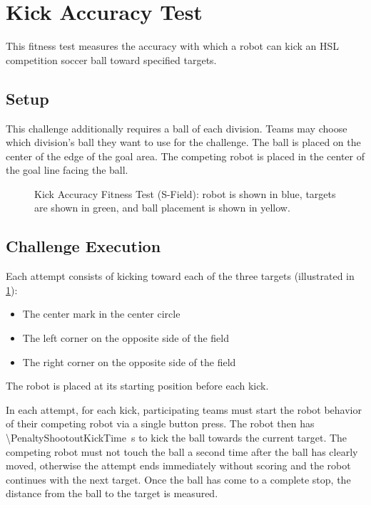 \section{Kick Accuracy Test}
This fitness test measures the accuracy with which a robot can kick an HSL competition soccer ball toward specified targets.

\subsection{Setup}
This challenge additionally requires a ball of each division. Teams may choose which division's ball they want to use for the challenge.
The ball is placed on the center of the edge of the goal area.
The competing robot is placed in the center of the goal line facing the ball.

\begin{figure}[ht]
    \centering
    
    \caption{Kick Accuracy Fitness Test (S-Field): robot is shown in blue, targets are shown in green, and ball placement is shown in yellow.}
    \label{fig:kick_accuracy_test_s}
\end{figure}

\subsection{Challenge Execution}
Each attempt consists of kicking toward each of the three targets (illustrated in \cref{fig:kick_accuracy_test_s}):

\begin{itemize}
    \item The center mark in the center circle
    \item The left corner on the opposite side of the field
    \item The right corner on the opposite side of the field
\end{itemize}

The robot is placed at its starting position before each kick.

In each attempt, for each kick, participating teams must start the robot behavior of their competing robot via a single button press. The robot then has \qty{\PenaltyShootoutKickTime}{\second} to kick the ball towards the current target.
The competing robot must not touch the ball a second time after the ball has clearly moved, otherwise the attempt ends immediately without scoring and the robot continues with the next target.
Once the ball has come to a complete stop, the distance from the ball to the target is measured.


